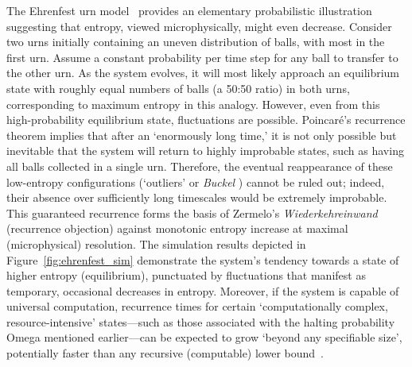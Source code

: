 \documentclass[shortAfour,sageh,times]{sagej}
\begin{document}
The Ehrenfest urn model~\citep{Ehrenfest_06g} provides an elementary probabilistic illustration suggesting that entropy, viewed microphysically, might even decrease.
Consider two urns initially containing an uneven distribution of balls, with most in the first urn.
Assume a constant probability per time step for any ball to transfer to the other urn.
As the system evolves, it will most likely approach an equilibrium state with roughly equal numbers of balls (a 50:50 ratio) in both urns, corresponding to maximum entropy in this analogy.
However, even from this high-probability equilibrium state, fluctuations are possible.
Poincar\'e's recurrence theorem implies that after an `enormously long time,' it is not only possible but inevitable that the system will return to highly improbable states, such as having all balls collected in a single urn.
Therefore, the eventual reappearance of these low-entropy configurations (`outliers' or \textit{Buckel} \citep{Ehrenfest_06g}) cannot be ruled out; indeed, their absence over sufficiently long timescales would be extremely improbable.
This guaranteed recurrence forms the basis of Zermelo's \textit{Wiederkehreinwand} (recurrence objection) against monotonic entropy increase at maximal (microphysical) resolution.
The simulation results depicted in Figure~\ref{fig:ehrenfest_sim} demonstrate the system's tendency towards a state of higher entropy (equilibrium), punctuated by fluctuations that manifest as temporary, occasional decreases in entropy.
Moreover, if the system is capable of universal computation,
recurrence times for certain `computationally complex, resource-intensive' states---such as those associated with the halting probability Omega mentioned earlier---can be expected to grow `beyond any specifiable size',
potentially faster than any recursive (computable) lower bound~\citep{svozil-93}.
\end{document}
